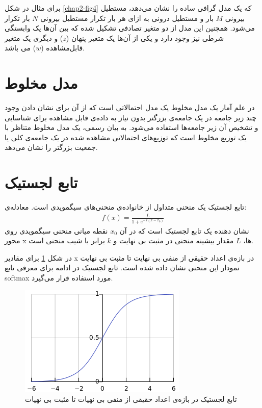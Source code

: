 برای مثال در شکل
\ref{chap2-fig4}
که یک مدل گرافی ساده را نشان می‌‌دهد، مستطیل بیرونی
$M$
بار و مستطیل درونی به ازای هر بار تکرار مستطیل بیرونی
$N$
بار تکرار می‌‌شود. همچنین این مدل از دو متغیر تصادفی تشکیل شده که بین آن‌ها یک وابستگی شرطی نیز وجود دارد و یکی‌ از آن‌ها یک متغیر پنهان
($z$)
و دیگری یک متغیر قابل‌مشاهده
($w$)
می‌ باشد.
\section{مدل مخلوط}
در علم آمار یک مدل مخلوط
یک مدل احتمالاتی است که از آن برای نشان دادن وجود چند زیر جامعه
در یک جامعه‌ی بزرگتر بدون نیاز به داده‌ی قابل مشاهده برای شناسایی‌ و تشخیص آن زیر جامعه‌ها استفاده می‌‌‌شود. به بیان رسمی‌، یک مدل مخلوط متناظر با یک توزیع مخلوط
 است که توزیع‌های احتمالاتی مشاهده شده در یک جامعه‌ی کلی‌ یا جمعیت بزرگتر را نشان می‌‌دهد.
	
\section{تابع لجستیک}
تابع لجستیک
 یک منحنی متداول از خانواده‌ی منحنی‌های سیگمویدی
  است. معاد‌له‌ی:
\begin{align}
	f(x) = \frac{L}{1+e^{-k(x-x_0)}}
	\label{eq1}
\end{align}
نشان دهنده یک تابع لجستیک است که در آن
$x_0$
نقطه میانی منحنی سیگمویدی روی محور
x
ها،
$L$
مقدار بیشینه منحنی در مثبت بی‌ نهایت و
$k$
برابر با شیب منحنی است.


 در شکل
\ref{fig3}
برای مقادیر x در بازه‌ی اعداد حقیقی‌ از منفی‌ بی‌ نهایت تا مثبت بی‌ نهایت نمودار این منحنی نشان داده شده است. تابع لجستیک در ادامه برای معرفی تابع
softmax
مورد استفاده قرار می‌‌گیرد.
\begin{figure}[!h]
	\centering
	\includegraphics[scale=0.5]{chap2-img/logistic_function}
	\caption{تابع لجستیک در بازه‌ی اعداد حقیقی‌ از منفی‌ بی‌ نهیات تا مثبت بی‌ نهیات }
	\label{fig3}
\end{figure}

